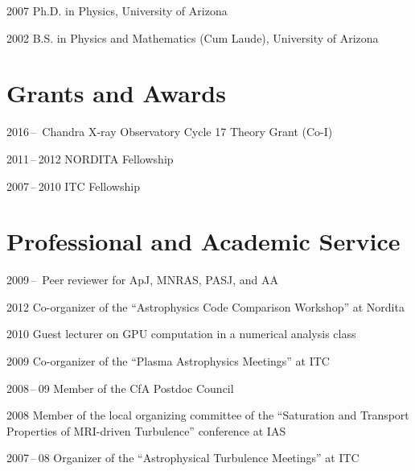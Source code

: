 \begin{tlist}

\item[2007] Ph.D. in Physics, University of Arizona

\item[2002] B.S. in Physics and Mathematics (Cum Laude), University of
  Arizona

\end{tlist}

\section*{Grants and Awards}

\begin{tlist}

\item[2016\,--\, ] Chandra X-ray Observatory Cycle 17 Theory Grant
  (Co-I)

\item[2011\,--\,2012] NORDITA Fellowship

\item[2007\,--\,2010] ITC Fellowship

\end{tlist}

\section*{Professional and Academic Service}

\begin{tlist}

\item[2009\,--\,] Peer reviewer for ApJ, MNRAS, PASJ, and AA

\item[2012] Co-organizer of the ``Astrophysics Code Comparison
  Workshop'' at Nordita

\item[2010] Guest lecturer on GPU computation in a numerical analysis
  class

\item[2009] Co-organizer of the ``Plasma Astrophysics Meetings'' at
  ITC

\item[2008\,--\,09] Member of the CfA Postdoc Council

\item[2008] Member of the local organizing committee of the
  ``Saturation and Transport Properties of MRI-driven Turbulence''
  conference at IAS

\item[2007\,--\,08] Organizer of the ``Astrophysical Turbulence
  Meetings'' at ITC

\end{tlist}

